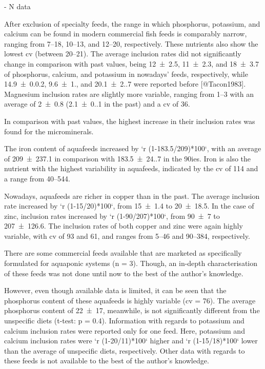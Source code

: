 - N data

After exclusion of specialty feeds, the range in which phosphorus, potassium, and calcium can be found in modern commercial fish feeds is comparably narrow, ranging from \SIrange{7}{18}{\gkg}, \SIrange{10}{13}{\gkg}, and \SIrange{12}{20}{\gkg}, respectively. These nutrients also show the lowest \gls{cv} (between \SIrange{20}{21}{\p}). The average inclusion rates did not significantly change in comparison with past values, being \SI{12(2.5)}{\gkg}, \SI{11(2.3)}{\gkg}, and \SI{18(3.7)}{\gkg} of phosphorus, calcium, and potassium in nowadays' feeds, respectively, while \SI{14.9(0.02)}{\gkg}, \SI{9.6(1.0)}{\gkg}, and \SI{20.1(2.7)}{\gkg} were reported before [@Tacon1983]. Magnesium inclusion rates are slightly more variable, ranging from \SIrange{1}{3}{\gkg} with an average of \SI{2(0.8)}{\gkg} (\SI{2.1(0.1)}{\gkg} in the past) and a \gls{cv} of \SI{36}{\p}.

In comparison with past values, the highest increase in their inclusion rates was found for the microminerals.

The iron content of aquafeeds increased by `r (1-183.5/209)*100`\si{\p}, with an average of \SI{209(237.1)}{\mgkg} in comparison with \SI{183.5(24.7)}{\mgkg} in the 90ies. Iron is also the nutrient with the highest variability in aquafeeds, indicated by the \gls{cv} of \SI{114}{\p} and a range from \SIrange{40}{544}{\mgkg}.

Nowadays, aquafeeds are richer in copper than in the past. The average inclusion rate increased by `r (1-15/20)*100`\si{\p}, from \SI{15(1.4)}{\mgkg} to \SI{20(18.5)}{\mgkg}. In the case of zinc, inclusion rates increased by `r (1-90/207)*100`\si{\p}, from \SI{90(7)}{\mgkg} to \SI{207(126.6)}{\mgkg}. The inclusion rates of both copper and zinc were again highly variable, with \gls{cv} of \SI{93}{\p} and \SI{61}{\p}, and ranges from \SIrange{5}{46}{\mgkg} and \SIrange{90}{384}{\mgkg}, respectively.




There are some commercial feeds available that are marketed as specifically formulated for aquaponic systems (n = 3). Though, an in-depth characterisation of these feeds was not done until now to the best of the author's knowledge.



However, even though available data is limited, it can be seen that the phosphorus content of these aquafeeds is highly variable (\gls{cv} = \SI{76}{\p}). The average phosphorus content of \SI{22(17)}{\gkg}, meanwhile, is not significantly different from the unspecific diets (t-test: p = 0.4). Information with regards to potassium and calcium inclusion rates were reported only for one feed. Here, potassium and calcium inclusion rates were `r (1-20/11)*100`\si{\p} higher and `r (1-15/18)*100`\si{\p} lower than the average of unspecific diets, respectively. Other data with regards to these feeds is not available to the best of the author's knowledge.




